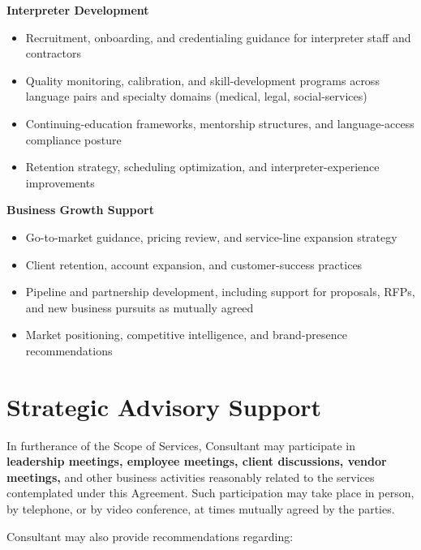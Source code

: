 \documentclass{toospoint}
\begin{document}
\vspace{4pt}
\noindent\textbf{\color{TPDark}Interpreter Development}
\begin{itemize}[leftmargin=1.5em, itemsep=2pt, topsep=2pt]
  \item Recruitment, onboarding, and credentialing guidance for interpreter staff and contractors
  \item Quality monitoring, calibration, and skill-development programs across language pairs and specialty domains (medical, legal, social-services)
  \item Continuing-education frameworks, mentorship structures, and language-access compliance posture
  \item Retention strategy, scheduling optimization, and interpreter-experience improvements
\end{itemize}

\vspace{4pt}
\noindent\textbf{\color{TPDark}Business Growth Support}
\begin{itemize}[leftmargin=1.5em, itemsep=2pt, topsep=2pt]
  \item Go-to-market guidance, pricing review, and service-line expansion strategy
  \item Client retention, account expansion, and customer-success practices
  \item Pipeline and partnership development, including support for proposals, RFPs, and new business pursuits as mutually agreed
  \item Market positioning, competitive intelligence, and brand-presence recommendations
\end{itemize}

\section{Strategic Advisory Support}

In furtherance of the Scope of Services, Consultant may participate in
\textbf{leadership meetings, employee meetings, client discussions, vendor
meetings,} and other business activities reasonably related to the services
contemplated under this Agreement. Such participation may take place in person,
by telephone, or by video conference, at times mutually agreed by the parties.

Consultant may also provide recommendations regarding:
\end{document}
